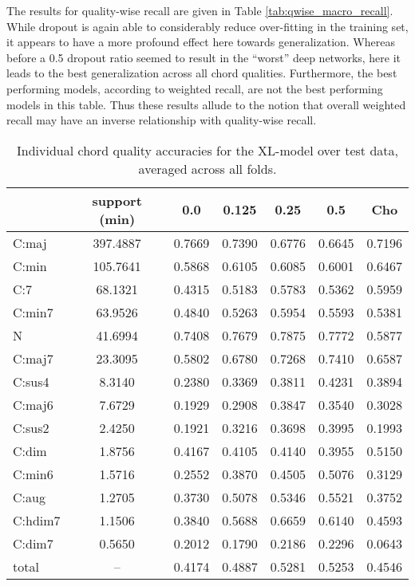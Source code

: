 The results for quality-wise recall are given in Table \ref{tab:qwise_macro_recall}.
While dropout is again able to considerably reduce over-fitting in the training set, it appears to have a more profound effect here towards generalization.
Whereas before a 0.5 dropout ratio seemed to result in the ``worst'' deep networks, here it leads to the best generalization across all chord qualities.
Furthermore, the best performing models, according to weighted recall, are not the best performing models in this table.
Thus these results allude to the notion that overall weighted recall may have an inverse relationship with quality-wise recall.


\begin{table}[t]
\begin{center}
\scriptsize
\caption{Individual chord quality accuracies for the XL-model over test data, averaged across all folds.}
\label{tab:ind_qwise_macro}
\begin{tabular}{l|ccccc|c}
\hline
    &   support (min) &    0.0 &   0.125 &   0.25 &    0.5 & Cho \\
\hline
 C:maj     &  397.4887 & 0.7669 &  0.7390 & 0.6776 & 0.6645 & 0.7196\\
 C:min     &  105.7641 & 0.5868 &  0.6105 & 0.6085 & 0.6001 & 0.6467\\
 C:7       &   68.1321 & 0.4315 &  0.5183 & 0.5783 & 0.5362 & 0.5959\\
 C:min7    &   63.9526 & 0.4840 &  0.5263 & 0.5954 & 0.5593 & 0.5381\\
 N         &   41.6994 & 0.7408 &  0.7679 & 0.7875 & 0.7772 & 0.5877\\
 C:maj7    &   23.3095 & 0.5802 &  0.6780 & 0.7268 & 0.7410 & 0.6587\\
 \hline
 C:sus4    &    8.3140 & 0.2380 &  0.3369 & 0.3811 & 0.4231 & 0.3894\\
 C:maj6    &    7.6729 & 0.1929 &  0.2908 & 0.3847 & 0.3540 & 0.3028\\
 C:sus2    &    2.4250 & 0.1921 &  0.3216 & 0.3698 & 0.3995 & 0.1993\\
 C:dim     &    1.8756 & 0.4167 &  0.4105 & 0.4140 & 0.3955 & 0.5150\\
 C:min6    &    1.5716 & 0.2552 &  0.3870 & 0.4505 & 0.5076 & 0.3129\\
 C:aug     &    1.2705 & 0.3730 &  0.5078 & 0.5346 & 0.5521 & 0.3752\\
 C:hdim7   &    1.1506 & 0.3840 &  0.5688 & 0.6659 & 0.6140 & 0.4593\\
 C:dim7    &    0.5650 & 0.2012 &  0.1790 & 0.2186 & 0.2296 & 0.0643\\
 \hline
 total & -- & 0.4174 &  0.4887 & 0.5281 & 0.5253 & 0.4546 \\
\hline
\end{tabular}
\end{center}
\end{table}


